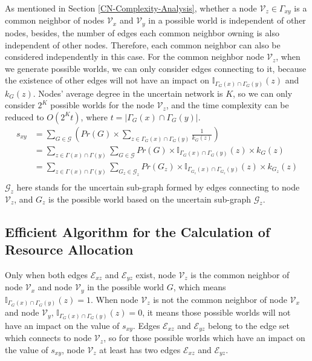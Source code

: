 \documentclass[\main/thesis.tex]{subfiles}
\begin{document}
As mentioned in Section \ref{CN-Complexity-Analysis}, whether a node $\mathcal{V}_z \in \Gamma_{xy}$ is a common neighbor of nodes $\mathcal{V}_x$ and $\mathcal{V}_y$ in a possible world is independent of other nodes, besides, the number of edges each common neighbor owning is also independent of other nodes.  Therefore, each common neighbor can also be considered independently in this case. For the common neighbor node $\mathcal{V}_z$, when we generate possible worlds, we can only consider edges connecting to it, because the existence of other edges will not have an impact on $\mathbb{I}_{\Gamma_G(x)\cap\Gamma_G(y)}(z)$ and $k_G(z)$. Nodes' average degree in the uncertain network is $K$, so we can only consider $2^K$ possible worlds for the node $\mathcal{V}_z$, and the time complexity can be reduced to $O(2^{K}t)$, where $t=|\Gamma_G(x)\cap\Gamma_G(y)|$. 
\begin{align*}
s_{xy}&=\sum_{G\in \mathcal{G}}( Pr(G)\times\sum_{z\in \Gamma_G(x)\cap\Gamma_G(y)}\frac{1}{k_G(z)})\\
&=\sum_{z\in \Gamma(x)\cap\Gamma(y)}\sum_{G\in \mathcal{G}}Pr(G)\times\mathbb{I}_{\Gamma_G(x)\cap\Gamma_G(y)}(z)\times k_G(z)\\
&=\sum_{z\in \Gamma(x)\cap\Gamma(y)}\sum_{{G_z}\in \mathcal{G}_z}Pr({G_z})\times\mathbb{I}_{\Gamma_{G_z}(x)\cap\Gamma_{G_z}(y)}(z)\times k_{G_z}(z)\\
\end{align*}
$\mathcal{G}_z$ here stands for the uncertain sub-graph formed by edges connecting to node $\mathcal{V}_z$, and $G_z$ is the possible world based on the uncertain sub-graph $\mathcal{G}_z$.

\subsection{Efficient Algorithm for the Calculation of Resource Allocation}

Only when both edges $\mathcal{E}_{xz}$ and $\mathcal{E}_{yz}$ exist, node $\mathcal{V}_z$ is the common neighbor of node $\mathcal{V}_x$ and node $\mathcal{V}_y$ in the possible world $G$, which means $\mathbb{I}_{\Gamma_G(x)\cap\Gamma_G(y)}(z)=1$. When node $\mathcal{V}_z$ is not the common neighbor of node $\mathcal{V}_x$ and node $\mathcal{V}_y$, $\mathbb{I}_{\Gamma_G(x)\cap\Gamma_G(y)}(z)=0$, it means those possible worlds will not have an impact on the value of $s_{xy}$. Edges $\mathcal{E}_{xz}$ and $\mathcal{E}_{yz}$ belong to the edge set which connects to node $\mathcal{V}_z$, so for those possible worlds which have an impact on the value of $s_{xy}$, node $\mathcal{V}_z$ at least has two edges $\mathcal{E}_{xz}$ and $\mathcal{E}_{yz}$.
\end{document}
